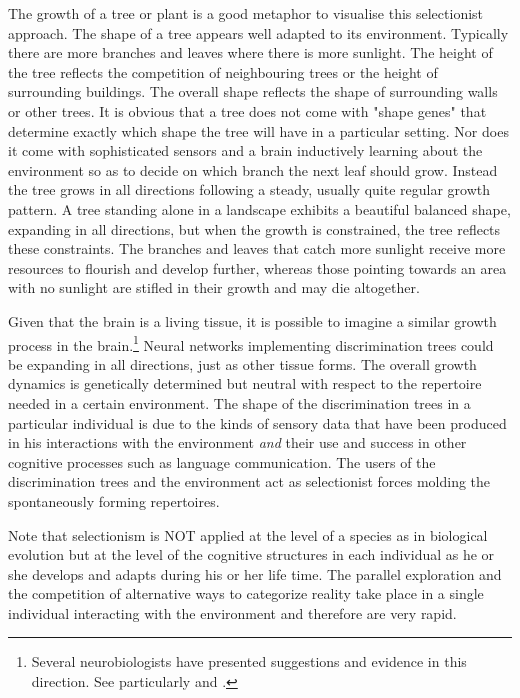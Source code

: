 The growth of a tree or plant is a good 
metaphor to visualise this selectionist approach. 
The shape of a tree appears well adapted to 
its environment. Typically there are more branches and leaves 
where there is more sunlight. The height of
the tree reflects the competition of neighbouring trees
or the height of surrounding buildings. The overall shape reflects
the shape of surrounding walls or other trees. 
It is obvious that a tree
does not come with "shape genes" that determine
exactly which shape the tree will have in a particular 
setting. Nor does it come with sophisticated sensors
and a brain inductively learning about the environment
so as to decide on which branch the next leaf should grow. 
Instead the tree grows in all directions following
a steady, usually quite regular growth pattern. A tree
standing alone in a landscape exhibits a beautiful 
balanced shape, expanding in all directions, but when the 
growth is constrained, the tree reflects these constraints. 
The branches and leaves that catch more sunlight receive more resources 
to flourish and develop further, whereas those 
pointing towards an area with no sunlight are stifled in 
their growth and may die altogether.  

Given that the brain is a living tissue, it is possible 
to imagine a similar growth process in the brain.\footnote{
Several neurobiologists have presented 
suggestions and evidence in this direction. See 
particularly \cite{Edelman:1987} and \cite{Changeux:1997}.}
Neural networks implementing discrimination trees could be expanding
in all directions, just as other
tissue forms. The overall growth dynamics is 
genetically determined but neutral with respect to 
the repertoire needed in a certain environment. 
The shape of the discrimination trees in a particular 
individual is due to the kinds of sensory 
data that have been produced in his interactions with
the environment {\it and} their use and success
in other cognitive processes such as language
communication. The
users of the discrimination trees and the environment act
as selectionist forces molding the spontaneously forming 
repertoires.

Note that selectionism is NOT applied at 
the level of a species as in biological evolution but 
at the level of the cognitive structures in each individual
as he or she develops and adapts during his or her life 
time. The parallel exploration and the competition of 
alternative ways to categorize reality take 
place in a single individual interacting with the environment
and therefore are very rapid.

